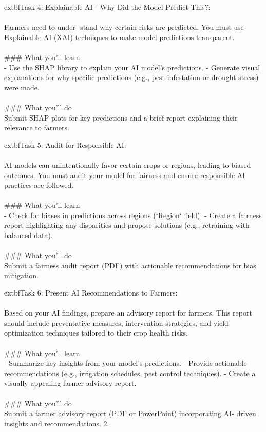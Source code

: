 \documentclass{article}
\begin{document}
	extbf{Task 4:} Explainable AI - Why Did the Model Predict This?:  \\
 \\
 Farmers need to under- stand why certain risks are predicted. You must use Explainable AI (XAI) techniques to make model predictions transparent. \\
 \\
### What you'll learn \\
- Use the SHAP library to explain your AI model’s predictions. - Generate visual explanations for why specific predictions (e.g., pest infestation or drought stress) were made. \\
 \\
### What you'll do \\
Submit SHAP plots for key predictions and a brief report explaining their relevance to farmers.

	extbf{Task 5:} Audit for Responsible AI:  \\
 \\
 AI models can unintentionally favor certain crops or regions, leading to biased outcomes. You must audit your model for fairness and ensure responsible AI practices are followed. \\
 \\
### What you'll learn \\
- Check for biases in predictions across regions (‘Region‘ field). - Create a fairness report highlighting any disparities and propose solutions (e.g., retraining with balanced data). \\
 \\
### What you'll do \\
Submit a fairness audit report (PDF) with actionable recommendations for bias mitigation.

	extbf{Task 6:} Present AI Recommendations to Farmers:  \\
 \\
 Based on your AI findings, prepare an advisory report for farmers. This report should include preventative measures, intervention strategies, and yield optimization techniques tailored to their crop health risks. \\
 \\
### What you'll learn \\
- Summarize key insights from your model’s predictions. - Provide actionable recommendations (e.g., irrigation schedules, pest control techniques). - Create a visually appealing farmer advisory report. \\
 \\
### What you'll do \\
Submit a farmer advisory report (PDF or PowerPoint) incorporating AI- driven insights and recommendations. 2.
\end{document}
